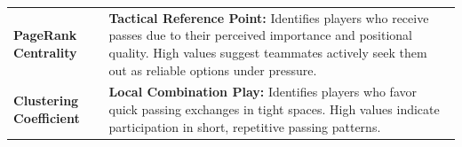 \documentclass[12pt, a4paper]{article}
\begin{document}
\begin{table}[htbp]
\begin{tabularx}{\textwidth}{l X}
        \addlinespace[3pt]
        \textbf{PageRank Centrality} & \textbf{Tactical Reference Point:} Identifies players who receive passes due to their perceived importance and positional quality. High values suggest teammates actively seek them out as reliable options under pressure. \\
        \addlinespace[3pt]
        \textbf{Clustering Coefficient} & \textbf{Local Combination Play:} Identifies players who favor quick passing exchanges in tight spaces. High values indicate participation in short, repetitive passing patterns. \\
        \bottomrule
    \end{tabularx}
\end{table}

\newpage
\end{document}
